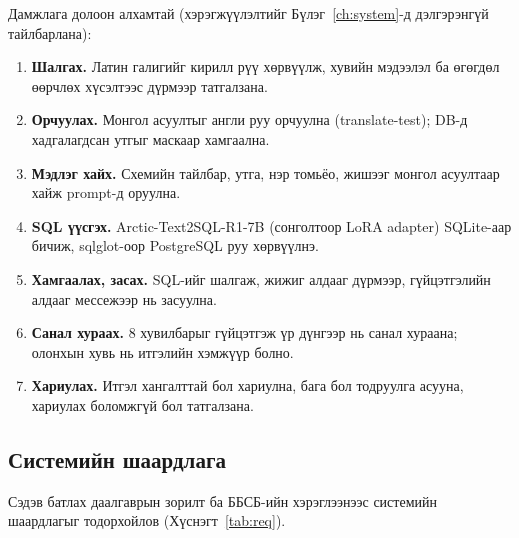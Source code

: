 Дамжлага долоон алхамтай (хэрэгжүүлэлтийг Бүлэг~\ref{ch:system}-д дэлгэрэнгүй тайлбарлана):
\begin{enumerate}
  \item \textbf{Шалгах.} Латин галигийг кирилл рүү хөрвүүлж, хувийн мэдээлэл ба өгөгдөл өөрчлөх хүсэлтээс дүрмээр татгалзана.
  \item \textbf{Орчуулах.} Монгол асуултыг англи руу орчуулна (translate-test); DB-д хадгалагдсан утгыг маскаар хамгаална.
  \item \textbf{Мэдлэг хайх.} Схемийн тайлбар, утга, нэр томьёо, жишээг монгол асуултаар хайж prompt-д оруулна.
  \item \textbf{SQL үүсгэх.} Arctic-Text2SQL-R1-7B (сонголтоор LoRA adapter) SQLite-аар бичиж, sqlglot-оор PostgreSQL руу хөрвүүлнэ.
  \item \textbf{Хамгаалах, засах.} SQL-ийг шалгаж, жижиг алдааг дүрмээр, гүйцэтгэлийн алдааг мессежээр нь засуулна.
  \item \textbf{Санал хураах.} 8 хувилбарыг гүйцэтгэж үр дүнгээр нь санал хураана; олонхын хувь нь итгэлийн хэмжүүр болно.
  \item \textbf{Хариулах.} Итгэл хангалттай бол хариулна, бага бол тодруулга асууна, хариулах боломжгүй бол татгалзана.
\end{enumerate}

\subsection{Системийн шаардлага}
\label{sec:requirements}

Сэдэв батлах даалгаврын зорилт ба ББСБ-ийн хэрэглээнээс системийн шаардлагыг тодорхойлов (Хүснэгт~\ref{tab:req}).

